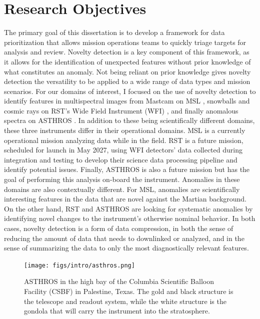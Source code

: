 \section{Research Objectives}
The primary goal of this dissertation is to develop a framework for data prioritization that allows mission operations teams to quickly triage targets for analysis and review.
Novelty detection is a key component of this framework, as it allows for the identification of unexpected features without prior knowledge of what constitutes an anomaly.
Not being reliant on prior knowledge gives novelty detection the versatility to be applied to a wide range of data types and mission scenarios.
For our domains of interest, I focused on the use of novelty detection to identify features in multispectral images from Mastcam on MSL \parencite{horton2021integrating}, snowballs and cosmic rays on RST's Wide Field Instrument (WFI) \parencite{horton2024anomaly}, and finally anomalous spectra on ASTHROS \parencite{horton2024board}.
In addition to these being scientifically different domains, these three instruments differ in their operational domains.
MSL is a currently operational mission analyzing data while in the field.
RST is a future mission, scheduled for launch in May 2027, using WFI detectors' data collected during integration and testing to develop their science data processing pipeline and identify potential issues.
Finally, ASTHROS is also a future mission but has the goal of performing this analysis on-board the instrument.
Anomalies in these domains are also contextually different.
For MSL, anomalies are scientifically interesting features in the data that are novel against the Martian background.
On the other hand, RST and ASTHROS are looking for systematic anomalies by identifying novel changes to the instrument's otherwise nominal behavior. 
In both cases, novelty detection is a form of data compression, in both the sense of reducing the amount of data that needs to downlinked or analyzed, and in the sense of summarizing the data to only the most diagnostically relevant features.

\begin{figure}
\centering
\texttt{[image: figs/intro/asthros.png]}
\caption[The Astrophysics Stratospheric Telescope for High Spectral Resolution Observations at Submillimeter-wavelengths (ASTHROS)]{
    ASTHROS in the high bay of the Columbia Scientific Balloon Facility (CSBF) in Palestine, Texas. 
    The gold and black structure is the telescope and readout system, while the white structure is the gondola that will carry the instrument into the stratosphere. 
}
\label{intro/fig:asthros}
\end{figure}

